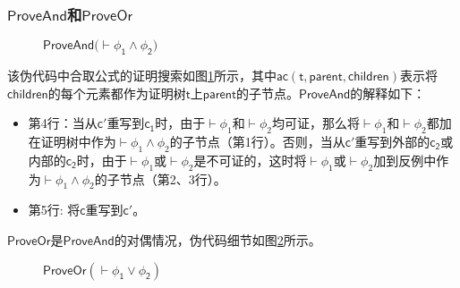 \subsubsection{$\mathsf{ProveAnd}$和$\mathsf{ProveOr}$}
\begin{figure}[h!]\footnotesize
	\centering
	\noindent{}
	\caption{$\mathsf{ProveAnd (\vdash\phi_1\wedge\phi_2})$}
	\label{algorithm:and}
\end{figure}
该伪代码中合取公式的证明搜索如图\ref{algorithm:and}所示，其中$\mathsf{ac (t, parent, children)}$表示将$\mathsf{children}$的每个元素都作为证明树$\mathsf{t}$上$\mathsf{parent}$的子节点。$\mathsf{ProveAnd}$的解释如下：

\begin{itemize}
	\item 第4行：当从$\mathsf{c'}$重写到$\mathsf{c_1}$时，由于$\vdash\phi_1$和$\vdash\phi_2$均可证，那么将$\vdash\phi_1$和$\vdash\phi_2$都加在证明树中作为$\vdash\phi_1\wedge\phi_2$的子节点（第1行）。否则，当从$\mathsf{c'}$重写到外部的$\mathsf{c_2}$或内部的$\mathsf{c_2}$时，由于$\vdash\phi_1$或$\vdash\phi_2$是不可证的，这时将$\vdash\phi_1$或$\vdash\phi_2$加到反例中作为$\vdash\phi_1\wedge\phi_2$的子节点（第2、3行）。
	\item 第5行: 将$\mathsf{c}$重写到$\mathsf{c'}$。
\end{itemize}


$\mathsf{ProveOr}$是$\mathsf{ProveAnd}$的对偶情况，伪代码细节如图\ref{algorithm:or}所示。
\begin{figure}[h!]\footnotesize
	\centering
	\noindent{}
	\caption{$\mathsf{ProveOr (\vdash\phi_1\vee\phi_2)}$}
	\label{algorithm:or}
\end{figure}




